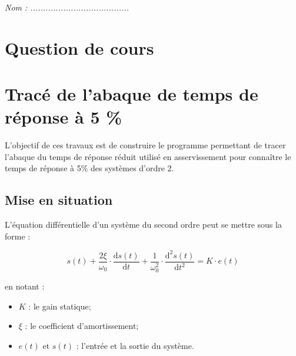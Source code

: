 \documentclass[10pt]{article}
\newif\ifprof
\begin{document}


\ifprof
\begin{center}
\large{\textit{Éléments de corrigé}}
\end{center}
\else
\begin{flushright}
\large{\textsl{Nom : .......................................}}
\end{flushright}
\fi

\vspace{1cm}


\section*{Question de cours}

\section*{Tracé de l'abaque de temps de réponse à 5 \%}

\begin{obj}

L'objectif de ces travaux est de construire le programme permettant de tracer l'abaque du temps de réponse réduit utilisé en asservissement pour connaître le temps de réponse à 5\% des systèmes d'ordre 2. 
\end{obj}

\subsection*{Mise en situation}

L'équation différentielle d'un système du second ordre peut se mettre sous la forme :

\vspace{.25cm}

\begin{minipage}[c]{.48\linewidth}
$$
s(t)
+\dfrac{2\xi}{\omega_0}\cdot \dfrac{\text{d}s(t)}{\text{d}t}
+\dfrac{1}{\omega_0^2}\cdot \dfrac{\text{d}^2s(t)}{\text{d}t^2}
= K\cdot e(t)
$$
\end{minipage}\hfill
\begin{minipage}[c]{.48\linewidth}
en notant :
\begin{itemize}
\item $K$ : le gain statique;
\item $\xi$ : le coefficient d'amortissement;
\item $e(t)$ et $s(t)$ : l'entrée et la sortie du système. 
\end{itemize}
\end{minipage}
\end{document}
